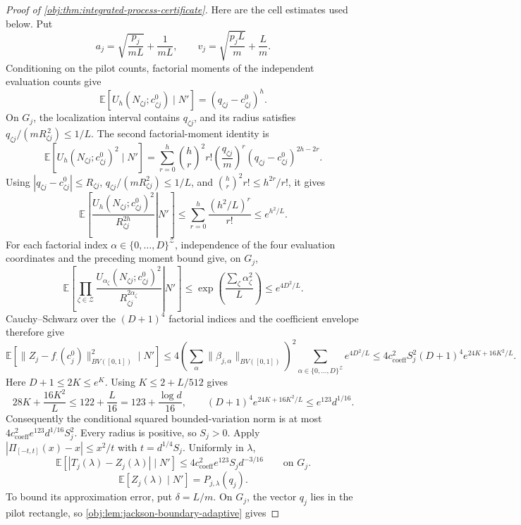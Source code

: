 \begin{proof}[Proof of \cref{obj:thm:integrated-process-certificate}]
Here are the cell estimates used below. Put
\[
a_j=\sqrt{\frac{p_j}{mL}}+\frac1{mL},
\qquad
v_j=\sqrt{\frac{p_jL}{m}}+\frac Lm.
\]
Conditioning on the pilot counts, factorial moments of the independent evaluation counts give
\[
\mathbb E\!\left[U_h(N_{\zeta j};c^0_{\zeta j})\mid N'\right]
 =(q_{\zeta j}-c^0_{\zeta j})^h.
\]
On \(G_j\), the localization interval contains \(q_{\zeta j}\), and its radius satisfies
\(q_{\zeta j}/(mR_{\zeta j}^{\,2})\leq1/L\). The second factorial-moment identity is
\[
\mathbb E\!\left[U_h(N_{\zeta j};c^0_{\zeta j})^2\mid N'\right]
 =\sum_{r=0}^{h}{h\choose r}^{\!2}r!
   \left(\frac{q_{\zeta j}}m\right)^r
   (q_{\zeta j}-c^0_{\zeta j})^{2h-2r}.
\]
Using \(|q_{\zeta j}-c^0_{\zeta j}|\leq R_{\zeta j}\), \(q_{\zeta j}/(mR_{\zeta j}^2)\leq1/L\), and \({h\choose r}^2r!\leq h^{2r}/r!\), it gives
\[
\mathbb E\!\left[\left.
 \frac{U_h(N_{\zeta j};c^0_{\zeta j})^2}{R_{\zeta j}^{2h}}
 \right|N'\right]
 \leq\sum_{r=0}^{h}\frac{(h^2/L)^r}{r!}
 \leq e^{h^2/L}.
\]
For each factorial index \(\alpha\in\{0,\ldots,D\}^{\mathcal Z}\), independence of the four evaluation coordinates and the preceding moment bound give, on \(G_j\),
\[
\mathbb E\!\left[\left.
\prod_{\zeta\in\mathcal Z}
\frac{U_{\alpha_\zeta}(N_{\zeta j};c^0_{\zeta j})^2}
     {R_{\zeta j}^{2\alpha_\zeta}}
\right|N'\right]
\leq \exp\!\left(\frac{\sum_\zeta\alpha_\zeta^2}{L}\right)
\leq e^{4D^2/L}.
\]
Cauchy–Schwarz over the \((D+1)^4\) factorial indices and the coefficient envelope therefore give
\[
\mathbb E\!\left[\|Z_j-f_\cdot(c_j^0)\|_{BV([0,1])}^2\mid N'\right]
\leq 4\left(\sum_\alpha\|\beta_{j,\alpha}\|_{BV([0,1])}\right)^2
       \sum_{\alpha\in\{0,\ldots,D\}^{\mathcal Z}}e^{4D^2/L}
\leq 4c_{\mathrm{coeff}}^2S_j^2(D+1)^4
       e^{24K+16K^2/L}.
\]
Here \(D+1\leq2K\leq e^K\). Using \(K\leq2+L/512\) gives
\[
28K+\frac{16K^2}{L}\leq122+\frac L{16}
=123+\frac{\log d}{16},
\qquad
(D+1)^4e^{24K+16K^2/L}\leq e^{123}d^{1/16}.
\]
Consequently the conditional squared bounded-variation norm is at most \(4c_{\mathrm{coeff}}^2e^{123}d^{1/16}S_j^2\). Every radius is positive, so \(S_j>0\). Apply \(|\Pi_{[-t,t]}(x)-x|\leq x^2/t\) with \(t=d^{1/4}S_j\). Uniformly in \(\lambda\),
\[
\mathbb E\!\left[|T_j(\lambda)-Z_j(\lambda)|\mid N'\right]
 \leq 4c_{\mathrm{coeff}}^2e^{123}S_jd^{-3/16}
 \qquad\text{on }G_j.
\]
\[
\mathbb E[Z_j(\lambda)\mid N']=P_{j,\lambda}(q_j).
\]
To bound its approximation error, put \(\delta=L/m\). On \(G_j\), the vector \(q_j\) lies in the pilot rectangle, so \cref{obj:lem:jackson-boundary-adaptive} gives

\end{proof}
